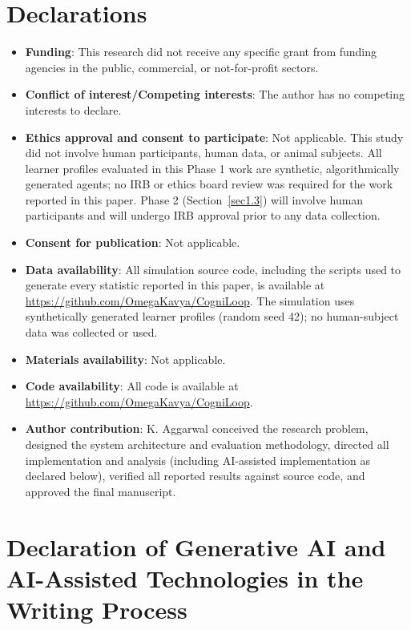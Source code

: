 \documentclass[pdflatex,sn-apa]{sn-jnl}
\begin{document}
\backmatter

\section*{Declarations}

\begin{itemize}
\item \textbf{Funding}: This research did not receive any specific grant from funding agencies in the public, commercial, or not-for-profit sectors.
\item \textbf{Conflict of interest/Competing interests}: The author has no competing interests to declare.
\item \textbf{Ethics approval and consent to participate}: Not applicable. This study did not involve human participants, human data, or animal subjects. All learner profiles evaluated in this Phase 1 work are synthetic, algorithmically generated agents; no IRB or ethics board review was required for the work reported in this paper. Phase 2 (Section~\ref{sec1.3}) will involve human participants and will undergo IRB approval prior to any data collection.
\item \textbf{Consent for publication}: Not applicable.
\item \textbf{Data availability}: All simulation source code, including the scripts used to generate every statistic reported in this paper, is available at \url{https://github.com/OmegaKavya/CogniLoop}. The simulation uses synthetically generated learner profiles (random seed 42); no human-subject data was collected or used.
\item \textbf{Materials availability}: Not applicable.
\item \textbf{Code availability}: All code is available at \url{https://github.com/OmegaKavya/CogniLoop}.
\item \textbf{Author contribution}: K. Aggarwal conceived the research problem, designed the system architecture and evaluation methodology, directed all implementation and analysis (including AI-assisted implementation as declared below), verified all reported results against source code, and approved the final manuscript.
\end{itemize}

\section*{Declaration of Generative AI and AI-Assisted Technologies in the Writing Process}
\end{document}
